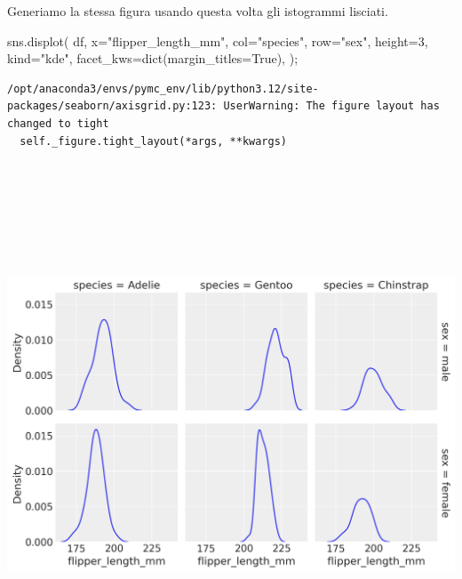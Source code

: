 \documentclass[
  letterpaper,
  krantz2]{{[}./krantz{]}}
\newenvironment{Shaded}{\begin{snugshade}}{\end{snugshade}}
\newcommand{\BuiltInTok}[1]{\textcolor[rgb]{0.00,0.23,0.31}{#1}}
\newcommand{\DecValTok}[1]{\textcolor[rgb]{0.68,0.00,0.00}{#1}}
\newcommand{\NormalTok}[1]{\textcolor[rgb]{0.00,0.23,0.31}{#1}}
\newcommand{\OperatorTok}[1]{\textcolor[rgb]{0.37,0.37,0.37}{#1}}
\newcommand{\StringTok}[1]{\textcolor[rgb]{0.13,0.47,0.30}{#1}}
\newcommand{\VariableTok}[1]{\textcolor[rgb]{0.07,0.07,0.07}{#1}}
\begin{document}
Generiamo la stessa figura usando questa volta gli istogrammi lisciati.

\begin{Shaded}
\begin{Highlighting}[]
\NormalTok{sns.displot(}
\NormalTok{    df, x}\OperatorTok{=}\StringTok{"flipper\_length\_mm"}\NormalTok{, col}\OperatorTok{=}\StringTok{"species"}\NormalTok{, row}\OperatorTok{=}\StringTok{"sex"}\NormalTok{,}
\NormalTok{    height}\OperatorTok{=}\DecValTok{3}\NormalTok{, kind}\OperatorTok{=}\StringTok{"kde"}\NormalTok{, facet\_kws}\OperatorTok{=}\BuiltInTok{dict}\NormalTok{(margin\_titles}\OperatorTok{=}\VariableTok{True}\NormalTok{),}
\NormalTok{)}\OperatorTok{;}
\end{Highlighting}
\end{Shaded}

\begin{verbatim}
/opt/anaconda3/envs/pymc_env/lib/python3.12/site-packages/seaborn/axisgrid.py:123: UserWarning: The figure layout has changed to tight
  self._figure.tight_layout(*args, **kwargs)
\end{verbatim}

\includegraphics[width=9.27083in,height=6.125in]{chapters/python/08_seaborn_files/figure-pdf/cell-6-output-2.png}
\end{document}
